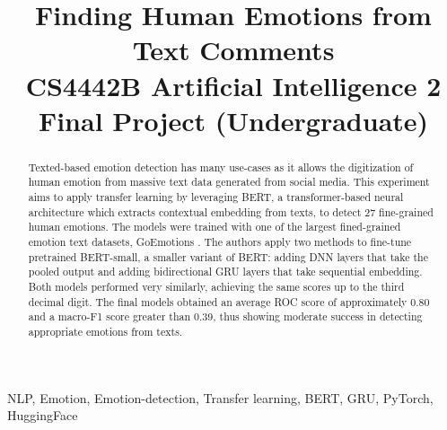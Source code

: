 \documentclass[conference]{IEEEtran}
\begin{document}
\title{Finding Human Emotions from Text Comments\\
{\footnotesize CS4442B Artificial Intelligence 2 Final Project (Undergraduate)}}
\author{
\and
{}
}

\maketitle

\begin{abstract}
Texted-based emotion detection has many use-cases as it allows the digitization of human emotion from massive text data generated from social media. This experiment aims to apply transfer learning by leveraging BERT\cite{DBLP:journals/corr/abs-1810-04805}, a transformer-based\cite {DBLP:journals/corr/VaswaniSPUJGKP17} neural architecture which extracts contextual embedding from texts, to detect 27 fine-grained human emotions. The models were trained with one of the largest fined-grained emotion text datasets, GoEmotions \cite{DBLP:journals/corr/abs-2005-00547}. The authors apply two methods to fine-tune pretrained BERT-small\cite{bhargava2021generalization}\cite{DBLP:journals/corr/abs-1908-08962}, a smaller variant of BERT: adding DNN layers that take the pooled output and adding bidirectional GRU layers \cite{DBLP:journals/corr/ChoMBB14} that take sequential embedding. Both models performed very similarly, achieving the same scores up to the third decimal digit. The final models obtained an average ROC score of approximately 0.80 and a macro-F1 score greater than 0.39, thus showing moderate success in detecting appropriate emotions from texts. 
\end{abstract}

\begin{IEEEkeywords}
NLP, Emotion, Emotion-detection, Transfer learning, BERT, GRU, PyTorch, HuggingFace
\end{IEEEkeywords}
\end{document}
